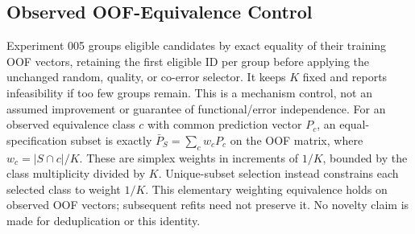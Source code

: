 \subsection{Observed OOF-Equivalence Control}
Experiment 005 groups eligible candidates by exact equality of their training
OOF vectors, retaining the first eligible ID per group before applying the
unchanged random, quality, or co-error selector. It keeps $K$ fixed and reports
infeasibility if too few groups remain. This is a mechanism control, not an
assumed improvement or guarantee of functional/error independence.
For an observed equivalence class $c$ with common prediction vector $P_c$, an
equal-specification subset is exactly $\bar P_S=\sum_c w_cP_c$ on the OOF matrix,
where $w_c=|S\cap c|/K$. These are simplex weights in increments of $1/K$,
bounded by the class multiplicity divided by $K$. Unique-subset selection
instead constrains each selected class to weight $1/K$. This elementary
weighting equivalence holds on observed OOF vectors; subsequent refits need
not preserve it. No novelty claim is made for deduplication or this identity.
